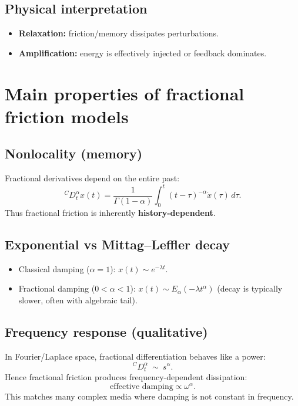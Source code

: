 \subsection{Physical interpretation}
\begin{itemize}
\item \textbf{Relaxation:} friction/memory dissipates perturbations.
\item \textbf{Amplification:} energy is effectively injected or feedback dominates.
\end{itemize}


\section{Main properties of fractional friction models}

\subsection{Nonlocality (memory)}
Fractional derivatives depend on the entire past:
\begin{equation}
{}^{C}D_t^\alpha x(t)
=
\frac{1}{\Gamma(1-\alpha)}
\int_0^t (t-\tau)^{-\alpha}\dot{x}(\tau)\,d\tau.
\end{equation}
Thus fractional friction is inherently \textbf{history-dependent}.

\subsection{Exponential vs Mittag--Leffler decay}
\begin{itemize}
\item Classical damping ($\alpha=1$): $x(t)\sim e^{-\lambda t}$.
\item Fractional damping ($0<\alpha<1$): $x(t)\sim E_\alpha(-\lambda t^\alpha)$
(decay is typically slower, often with algebraic tail).
\end{itemize}

\subsection{Frequency response (qualitative)}
In Fourier/Laplace space, fractional differentiation behaves like a power:
\begin{equation}
{}^{C}D_t^\alpha \ \sim\ s^\alpha.
\end{equation}
Hence fractional friction produces frequency-dependent dissipation:
\begin{equation}
\text{effective damping} \propto \omega^\alpha.
\end{equation}
This matches many complex media where damping is not constant in frequency.

